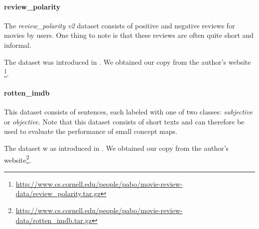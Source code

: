 \paragraph{review\_polarity}
The \textit{review\_polarity v2} dataset consists of positive and negative reviews for movies by users.
One thing to note is that these reviews are often quite short and informal.

The dataset was introduced in \cite{Pang2004}. We obtained our copy from the author's website \footnote{\url{http://www.cs.cornell.edu/people/pabo/movie-review-data/review\_polarity.tar.gz}}.

\paragraph{rotten\_imdb}
This dataset consists of sentences, each labeled with one of two classes: \textit{subjective} or \textit{objective}.
Note that this dataset consists of short texts and can therefore be used to evaluate the performance of small concept maps.

The dataset w as introduced in \cite{Pang2004}. We obtained our copy from the author's website\footnote{\url{http://www.cs.cornell.edu/people/pabo/movie-review-data/rotten\_imdb.tar.gz}}.

